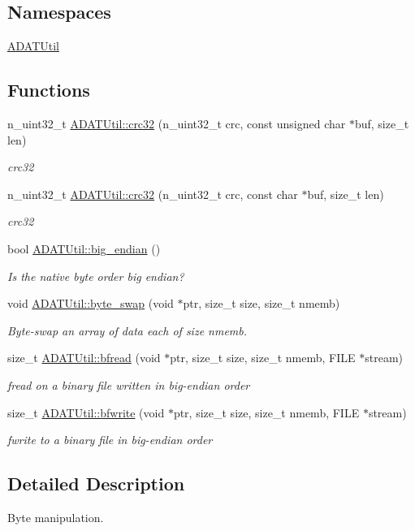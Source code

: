 \subsection*{Namespaces}
\begin{DoxyCompactItemize}
\item 
 \mbox{\hyperlink{namespaceADATUtil}{A\+D\+A\+T\+Util}}
\end{DoxyCompactItemize}
\subsection*{Functions}
\begin{DoxyCompactItemize}
\item 
n\+\_\+uint32\+\_\+t \mbox{\hyperlink{namespaceADATUtil_a61372c5ac63a8bd3ce0aec8f04f386d9}{A\+D\+A\+T\+Util\+::crc32}} (n\+\_\+uint32\+\_\+t crc, const unsigned char $\ast$buf, size\+\_\+t len)
\begin{DoxyCompactList}\small\item\em crc32 \end{DoxyCompactList}\item 
n\+\_\+uint32\+\_\+t \mbox{\hyperlink{namespaceADATUtil_aea7a30b468249f17899ebbb9902fb330}{A\+D\+A\+T\+Util\+::crc32}} (n\+\_\+uint32\+\_\+t crc, const char $\ast$buf, size\+\_\+t len)
\begin{DoxyCompactList}\small\item\em crc32 \end{DoxyCompactList}\item 
bool \mbox{\hyperlink{namespaceADATUtil_a7f9f0561f3ffcb562067ebedbade089f}{A\+D\+A\+T\+Util\+::big\+\_\+endian}} ()
\begin{DoxyCompactList}\small\item\em Is the native byte order big endian? \end{DoxyCompactList}\item 
void \mbox{\hyperlink{namespaceADATUtil_af522573b90be52b1e09342dd11e23199}{A\+D\+A\+T\+Util\+::byte\+\_\+swap}} (void $\ast$ptr, size\+\_\+t size, size\+\_\+t nmemb)
\begin{DoxyCompactList}\small\item\em Byte-\/swap an array of data each of size nmemb. \end{DoxyCompactList}\item 
size\+\_\+t \mbox{\hyperlink{namespaceADATUtil_af41a672c512fa9828e3ada70420985c9}{A\+D\+A\+T\+Util\+::bfread}} (void $\ast$ptr, size\+\_\+t size, size\+\_\+t nmemb, F\+I\+LE $\ast$stream)
\begin{DoxyCompactList}\small\item\em fread on a binary file written in big-\/endian order \end{DoxyCompactList}\item 
size\+\_\+t \mbox{\hyperlink{namespaceADATUtil_afcbd366717135244eee5acb0d5ba86ac}{A\+D\+A\+T\+Util\+::bfwrite}} (void $\ast$ptr, size\+\_\+t size, size\+\_\+t nmemb, F\+I\+LE $\ast$stream)
\begin{DoxyCompactList}\small\item\em fwrite to a binary file in big-\/endian order \end{DoxyCompactList}\end{DoxyCompactItemize}


\subsection{Detailed Description}
Byte manipulation. 

